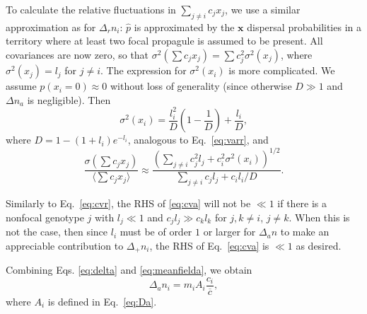 \documentclass[11pt]{article}
\begin{document}
To calculate the relative fluctuations in $\sum_{j\neq i} c_j x_j$, we use a similar approximation as for $\Delta_r n_i$: $\hat{p}$ is approximated by the ${\mathbf x}$ dispersal probabilities in a territory where at least two focal propagule is assumed to be present. All covariances are now zero, so that $\sigma^2(\sum c_j x_j)=\sum c_j^2 \sigma^2(x_j)$, where $\sigma^2(x_j)=l_j$ for $j\neq i$. The expression for $\sigma^2(x_i)$ is more complicated. We assume $p(x_i=0)\approx 0$ without loss of generality (since otherwise $D\gg 1$ and $\Delta n_a$ is negligible). Then
\begin{equation}
\sigma^2(x_i)=\frac{l_i^2}{D}\left(1-\frac{1}{D}\right)+\frac{l_i}{D},
\end{equation}
where $D=1-(1+l_i)e^{-l_i}$, analogous to Eq.~\eqref{eq:varr}, and 
\begin{equation}
\frac{\sigma(\sum c_j x_j)}{\langle\sum c_j x_j\rangle} \approx\frac{\left(\sum_{j\neq i} c_j^2 l_j + c_i^2 \sigma^2(x_i)\right)^{1/2}}{\sum_{j\neq i} c_j l_j + c_i l_i/D} \label{eq:cva}.
\end{equation}

Similarly to Eq.~\eqref{eq:cvr}, the RHS of \eqref{eq:cva} will not be $\ll1$ if there is a nonfocal genotype $j$ with $l_j\ll 1$ and $c_j l_j\gg c_k l_k$ for $j,k\neq i$, $j\neq k$. When this is not the case, then since $l_i$ must be of order $1$ or larger for $\Delta_a n$ to make an appreciable contribution to $\Delta_+ n_i$, the RHS of Eq.~\eqref{eq:cva} is $\ll 1$ as desired. 

Combining Eqs. \eqref{eq:delta} and \eqref{eq:meanfielda}, we obtain
\begin{equation}
\Delta_a n_i=m_i A_i \frac{c_i}{\overline{c}},
\end{equation}
where $A_i$ is defined in Eq.~\eqref{eq:Da}.

%
%
\end{document}
